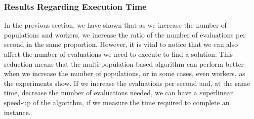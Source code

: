 \documentclass[review]{elsarticle}
\begin{document}


\subsubsection{Results Regarding Execution Time}
\label{sec:exec-time}

In the previous section, we have shown that as we increase the number of
populations and workers, we increase the ratio of the number of evaluations per
second in the same proportion. However, it is vital to notice that we can also
affect the number of evaluations we need to execute to find a solution. This
reduction means that the multi-population based algorithm can perform better
when we increase the number of populations, or in some cases, even workers, as the experiments
show. If we increase the evaluations per second and, at the same time, decrease
the number of evaluations needed, we can have a superlinear speed-up of the
algorithm, if we measure the time required to complete an instance.
\end{document}
